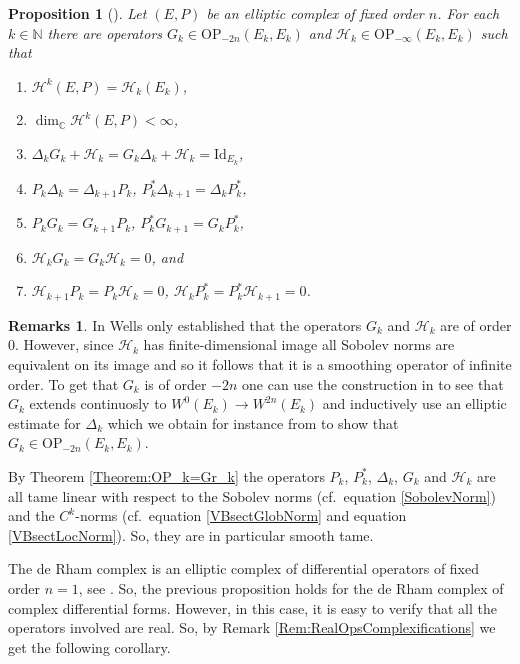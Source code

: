 \documentclass[12pt,a4paper]{article}
\theoremstyle{plain}
\newtheorem{proposition}[theorem]{Proposition}
\theoremstyle{definition}
\newtheorem{remarks}[theorem]{Remarks}
\newcommand{\N}{\mathbb{N}}
\newcommand{\OP}{\mathrm{OP}}
\newcommand{\Hcal}{\mathcal{H}}
\begin{document}
\begin{proposition}[{\cite[§4, Theorem 4.12, Theorem 5.2 and Theorem 5.3]{Wells07}}]
\label{Prop:HodgeRelations}
Let $(E,P)$ be an elliptic complex of fixed order $n$.
For each $k\in \N$ there are operators $G_k\in \OP_{-2n}(E_k,E_k)$ and $\Hcal_k\in \OP_{-\infty}(E_k,E_k)$ such that 
\begin{enumerate}
    \item $\Hcal^k(E,P)=\Hcal_k(E_k)$,
    \item $\dim_{\mathbb C}\Hcal^k(E,P)<\infty$,
    \item $\Delta_k G_k+\Hcal_k=G_k \Delta_k+\Hcal_k=\mathrm{Id}_{E_k}$,
    \item $P_k \Delta_k=\Delta_{k+1} P_k$, $P^*_{k} \Delta_{k+1}=\Delta_{k} P^*_k$,
    \item $P_k G_k=G_{k+1} P_k$, $P^*_k G_{k+1}=G_{k} P^*_k$,
    \item $\Hcal_k G_k=G_k \Hcal_k=0$, and
    \item \label{Item:Hd=0} $\Hcal_{k+1} P_k=P_k \Hcal_k=0$, $\Hcal_{k} P^*_k=P^*_k \Hcal_{k+1}=0$.
\end{enumerate}
\end{proposition}

\begin{remarks}
    In \cite[§4, Theorem 4.12, Theorem 5.2 and Theorem 5.3]{Wells07} Wells only established that the operators $G_k$ and $\Hcal_k$ are of order $0$. However, since $\Hcal_k$ has finite-dimensional image all Sobolev norms are equivalent on its image and so it follows that it is a smoothing operator of infinite order. To get that $G_k$ is of order $-2n$ one can use the construction in \cite[Theorem 4.12]{Wells07} to see that $G_k$ extends continuosly to $W^0(E_k)\to W^{2n}(E_k)$ and inductively use an elliptic estimate for $\Delta_k$ which we obtain for instance from \cite[Theorem 4.4]{Wells07} to show that $G_k\in \OP_{-2n}(E_k,E_k)$.

\label{Rem:HodgeOpsSmoothTame}
By Theorem \ref{Theorem:OP_k=Gr_k} the operators $P_k$,
$P^*_k$, $\Delta_k$, $G_k$ and $\Hcal_k$ are all tame linear with respect to the Sobolev norms (cf.~equation \eqref{SobolevNorm}) and the $C^k$-norms (cf.~equation \eqref{VBsectGlobNorm} and equation \eqref{VBsectLocNorm}). So, they are in particular smooth tame.
\end{remarks}


The de Rham complex is an elliptic complex of differential operators of fixed order $n=1$, see \cite[§4, Example 2.5]{Wells07}. So, the previous proposition holds for the de Rham complex of complex differential forms. However, in this case, it is easy to verify that all the operators involved are real. 
So, by Remark \ref{Rem:RealOpsComplexifications} we get the following corollary.
\end{document}

